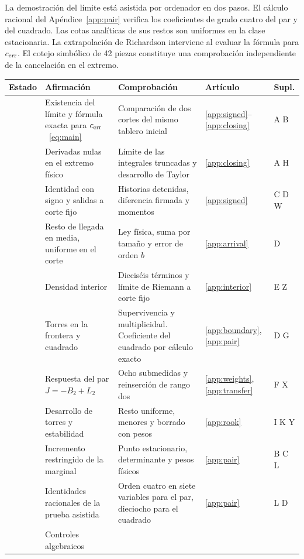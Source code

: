 La demostración del límite está asistida por ordenador en dos pasos. El cálculo racional
del Apéndice~\ref{app:pair} verifica los coeficientes de grado cuatro del par y del cuadrado.
Las cotas analíticas de sus restos son uniformes en la clase estacionaria. La
extrapolación de Richardson interviene al evaluar la fórmula para $c_{\mathrm{err}}$. El cotejo simbólico de
42 piezas constituye una comprobación independiente de la cancelación en el extremo.
{\small
\begin{longtable}{@{}L{.09\linewidth}L{.25\linewidth}L{.33\linewidth}L{.13\linewidth}L{.08\linewidth}@{}}
\toprule
Estado & Afirmación & Comprobación & Artículo & Supl.\\ \midrule
\endhead
{} & Existencia del límite y fórmula exacta para $c_{\mathrm{err}}$~\eqref{eq:main} &
 Comparación de dos cortes del mismo tablero inicial &
 \ref{app:signed}--\ref{app:closing} & A B \\
 & Derivadas nulas en el extremo físico &
 Límite de las integrales truncadas y desarrollo de Taylor &
 \ref{app:closing} & A H \\
 & Identidad con signo y salidas a corte fijo &
 Historias detenidas, diferencia firmada y momentos &
 \ref{app:signed} & C D W \\
 & Resto de llegada en media, uniforme en el corte &
 Ley física, suma por tamaño y error de orden $b$ &
 \ref{app:arrival} & D \\
 & Densidad interior &
 Dieciséis términos y límite de Riemann a corte fijo &
 \ref{app:interior} & E Z \\
 & Torres en la frontera y cuadrado &
 Supervivencia y multiplicidad. Coeficiente del cuadrado por cálculo exacto  &
 \ref{app:boundary}, \ref{app:pair} & D G \\
 & Respuesta del par $J=-B_2+L_2$ &
 Ocho submedidas y reinserción de rango dos &
 \ref{app:weights}, \ref{app:transfer} & F X \\
 & Desarrollo de torres y estabilidad &
 Resto uniforme, menores y borrado con pesos &
 \ref{app:rook} & I K Y \\
 & Incremento restringido de la marginal &
 Punto estacionario, determinante y pesos físicos &
 \ref{app:pair} & B C L \\
 & Identidades racionales de la prueba asistida &
 Orden cuatro en siete variables para el par, dieciocho para el cuadrado &
 \ref{app:pair} & L D \\
 & Controles algebraicos &

\end{longtable}}
